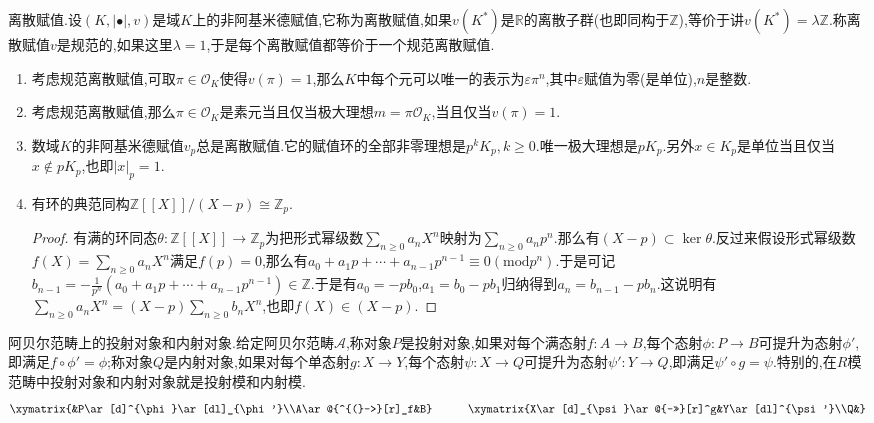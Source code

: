 离散赋值.设$(K,|\bullet|,v)$是域$K$上的非阿基米德赋值,它称为离散赋值,如果$v(K^*)$是$\mathbb{R}$的离散子群(也即同构于$\mathbb{Z}$),等价于讲$v(K^*)=\lambda\mathbb{Z}$.称离散赋值$v$是规范的,如果这里$\lambda=1$,于是每个离散赋值都等价于一个规范离散赋值.
\begin{enumerate}
	\item 考虑规范离散赋值,可取$\pi\in\mathscr{O}_K$使得$v(\pi)=1$,那么$K$中每个元可以唯一的表示为$\varepsilon\pi^n$,其中$\varepsilon$赋值为零(是单位),$n$是整数.
	\item 考虑规范离散赋值,那么$\pi\in\mathscr{O}_K$是素元当且仅当极大理想$m=\pi\mathscr{O}_K$,当且仅当$v(\pi)=1$.
	\item 数域$K$的非阿基米德赋值$v_p$总是离散赋值.它的赋值环的全部非零理想是$p^kK_p,k\ge0$.唯一极大理想是$pK_p$.另外$x\in K_p$是单位当且仅当$x\not\in pK_p$,也即$|x|_p=1$.
	\item 有环的典范同构$\mathbb{Z}[[X]]/(X-p)\cong\mathbb{Z}_p$.
	\begin{proof}
		
		有满的环同态$\theta:\mathbb{Z}[[X]]\to\mathbb{Z}_p$为把形式幂级数$\sum_{n\ge0}a_nX^n$映射为$\sum_{n\ge0}a_np^n$.那么有$(X-p)\subset\ker\theta$.反过来假设形式幂级数$f(X)=\sum_{n\ge0}a_nX^n$满足$f(p)=0$,那么有$a_0+a_1p+\cdots+a_{n-1}p^{n-1}\equiv0(\mathrm{mod}p^n)$.于是可记$b_{n-1}=-\frac{1}{p^n}(a_0+a_1p+\cdots+a_{n-1}p^{n-1})\in\mathbb{Z}$.于是有$a_0=-pb_0$,$a_1=b_0-pb_1$归纳得到$a_n=b_{n-1}-pb_n$.这说明有$\sum_{n\ge0}a_nX^n=(X-p)\sum_{n\ge0}b_nX^n$,也即$f(X)\in(X-p)$.
	\end{proof}
\end{enumerate}

阿贝尔范畴上的投射对象和内射对象.给定阿贝尔范畴$\mathscr{A}$,称对象$P$是投射对象,如果对每个满态射$f:A\to B$,每个态射$\phi:P\to B$可提升为态射$\phi'$,即满足$f\circ\phi'=\phi$;称对象$Q$是内射对象,如果对每个单态射$g:X\to Y$,每个态射$\psi:X\to Q$可提升为态射$\psi':Y\to Q$,即满足$\psi'\circ g=\psi$.特别的,在$R$模范畴中投射对象和内射对象就是投射模和内射模.
$$\xymatrix{&P\ar[d]^{\phi}\ar[dl]_{\phi'}\\A\ar@{^{(}->}[r]_f&B}\quad\quad\quad\xymatrix{X\ar[d]_{\psi}\ar@{->>}[r]^g&Y\ar[dl]^{\psi'}\\Q&}$$

